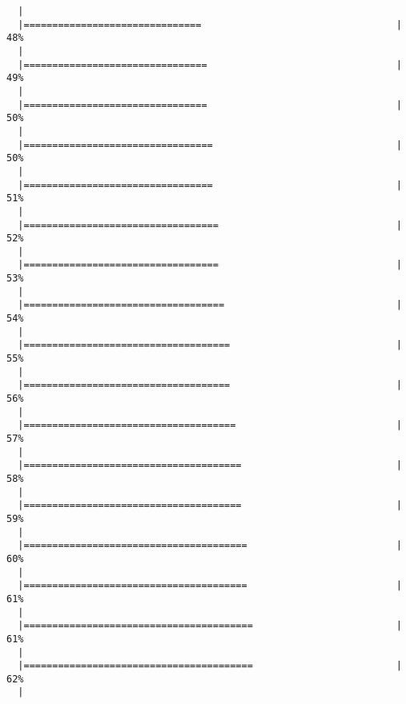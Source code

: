 \documentclass[]{article}
\begin{document}
\begin{verbatim}
  |                                                                       
  |===============================                                  |  48%
  |                                                                       
  |================================                                 |  49%
  |                                                                       
  |================================                                 |  50%
  |                                                                       
  |=================================                                |  50%
  |                                                                       
  |=================================                                |  51%
  |                                                                       
  |==================================                               |  52%
  |                                                                       
  |==================================                               |  53%
  |                                                                       
  |===================================                              |  54%
  |                                                                       
  |====================================                             |  55%
  |                                                                       
  |====================================                             |  56%
  |                                                                       
  |=====================================                            |  57%
  |                                                                       
  |======================================                           |  58%
  |                                                                       
  |======================================                           |  59%
  |                                                                       
  |=======================================                          |  60%
  |                                                                       
  |=======================================                          |  61%
  |                                                                       
  |========================================                         |  61%
  |                                                                       
  |========================================                         |  62%
  |                                                                       

\end{verbatim}
\end{document}
